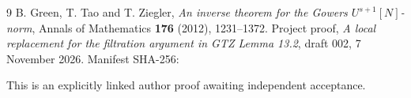 \documentclass[11pt]{article}
\begin{document}
\begin{thebibliography}{9}
 B. Green, T. Tao and T. Ziegler,
\emph{An inverse theorem for the Gowers $U^{s+1}[N]$-norm},
Annals of Mathematics \textbf{176} (2012), 1231--1372.
 Project proof, \emph{A local replacement for the filtration
argument in GTZ Lemma 13.2}, draft 002, 7 November 2026.
Manifest SHA-256:
\par{}
\par\noindent
This is an explicitly linked author proof awaiting independent acceptance.
\end{thebibliography}
\end{document}
